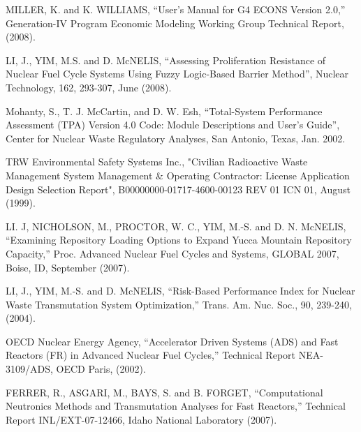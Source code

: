  MILLER, K. and K. WILLIAMS, ``User's Manual for G4 ECONS Version 2.0,''
Generation-IV Program Economic Modeling Working Group Technical Report,
(2008).

 LI, J., YIM, M.S. and D. McNELIS, ``Assessing Proliferation Resistance
of Nuclear Fuel Cycle Systems Using Fuzzy Logic-Based Barrier Method'',
Nuclear Technology, 162, 293-307, June (2008).

 Mohanty, S., T. J. McCartin, and D. W. Esh, ``Total-System Performance
Assessment (TPA) Version 4.0 Code: Module Descriptions and User's
Guide'', Center for Nuclear Waste Regulatory Analyses, San Antonio,
Texas, Jan. 2002.

 TRW Environmental Safety Systems Inc., "Civilian Radioactive Waste
Management System Management \& Operating Contractor: License
Application Design Selection Report", B00000000-01717-4600-00123 REV 01
ICN 01, August (1999).

 LI. J, NICHOLSON, M., PROCTOR, W. C., YIM, M.-S. and D. N. McNELIS,
``Examining Repository Loading Options to Expand Yucca Mountain
Repository Capacity,'' Proc. Advanced Nuclear Fuel Cycles and Systems,
GLOBAL 2007, Boise, ID, September (2007). 

 LI, J., YIM, M.-S. and D. McNELIS, ``Risk-Based Performance Index for
Nuclear Waste Transmutation System Optimization,'' Trans. Am. Nuc. Soc.,
90, 239-240, (2004).

 OECD Nuclear Energy Agency, ``Accelerator Driven Systems (ADS) and Fast
Reactors (FR) in Advanced Nuclear Fuel Cycles,'' Technical Report
NEA-3109/ADS, OECD Paris, (2002).

 FERRER, R., ASGARI, M., BAYS, S. and B. FORGET, ``Computational
Neutronics Methods and Transmutation Analyses for Fast Reactors,''
Technical Report INL/EXT-07-12466, Idaho National Laboratory (2007).

